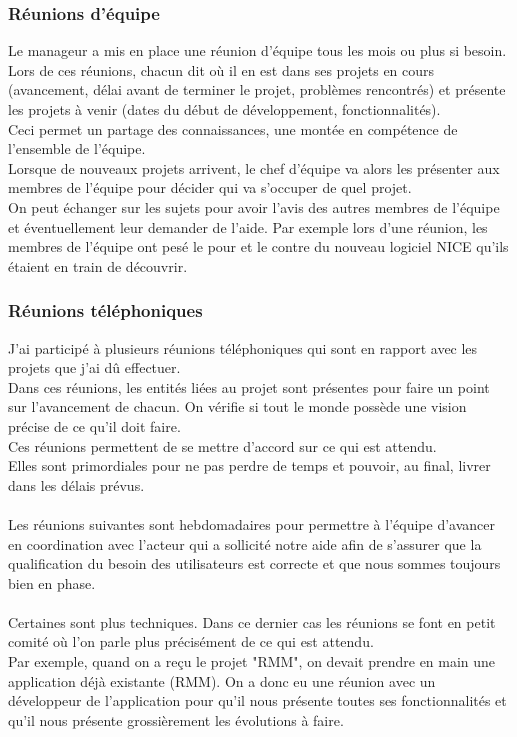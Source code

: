 \documentclass[a4paper,twoside,12pt]{report}
\begin{document}
\subsubsection{Réunions d'équipe}
Le manageur a mis en place une réunion d’équipe tous les mois ou plus si besoin.\\ 
Lors de ces réunions, chacun dit où il en est dans ses projets en cours (avancement, délai avant de terminer le projet, problèmes rencontrés) et présente les projets à venir (dates du début de développement, fonctionnalités).\\
Ceci permet un partage des connaissances, une montée en compétence de l'ensemble de l'équipe.\\
Lorsque de nouveaux projets arrivent, le chef d'équipe va alors les présenter aux membres de l'équipe pour décider qui va s'occuper de quel projet.\\
On peut échanger sur les sujets pour avoir l'avis des autres membres de l'équipe et éventuellement leur demander de l'aide. Par exemple lors d'une réunion, les membres de l'équipe ont pesé le pour et le contre du nouveau logiciel NICE qu'ils étaient en train de découvrir.
\subsubsection{Réunions téléphoniques}
J’ai participé à plusieurs réunions téléphoniques qui sont en rapport avec les projets que j'ai dû effectuer.\\ 
Dans ces réunions, les entités liées au projet sont présentes pour faire un point sur l’avancement de chacun. On vérifie si tout le monde possède une vision précise de ce qu’il doit faire.\\
Ces réunions permettent de se mettre d’accord sur ce qui est attendu.\\ 
Elles sont primordiales pour ne pas perdre de temps et pouvoir, au final, livrer dans les délais prévus.\\\\
Les réunions suivantes sont hebdomadaires pour permettre à l’équipe d’avancer en coordination avec l’acteur qui a sollicité notre aide afin de s’assurer que la qualification du besoin des utilisateurs est correcte et que nous sommes toujours bien en phase.\\\\
Certaines sont plus techniques. Dans ce dernier cas les réunions se font en petit comité où l'on parle plus précisément de ce qui est attendu.\\
Par exemple, quand on a reçu le projet "RMM", on devait prendre en main une application déjà existante (RMM). On a donc eu une réunion avec un développeur de l’application pour qu’il nous présente toutes ses fonctionnalités et qu'il nous présente grossièrement les évolutions à faire.\\ 
\newpage
\end{document}
